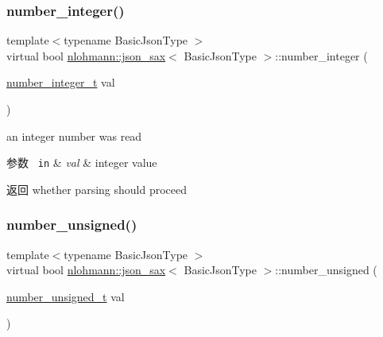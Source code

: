 \subsubsection{\texorpdfstring{number\_integer()}{number\_integer()}}
{\footnotesize\ttfamily template$<$typename Basic\+Json\+Type $>$ \\
virtual bool \mbox{\hyperlink{structnlohmann_1_1json__sax}{nlohmann\+::json\+\_\+sax}}$<$ Basic\+Json\+Type $>$\+::number\+\_\+integer (\begin{DoxyParamCaption}\item[{\mbox{\hyperlink{structnlohmann_1_1json__sax_a0cef30121f02b7fee85e9708148ea0aa}{number\+\_\+integer\+\_\+t}}}]{val }\end{DoxyParamCaption})\hspace{0.3cm}{\ttfamily [pure virtual]}}



an integer number was read 


\begin{DoxyParams}[1]{参数}
\mbox{\texttt{ in}}  & {\em val} & integer value \\
\hline
\end{DoxyParams}
\begin{DoxyReturn}{返回}
whether parsing should proceed 
\end{DoxyReturn}
\mbox{\label{structnlohmann_1_1json__sax_ad9b253083e0509923ba195136f49face}} 
\subsubsection{\texorpdfstring{number\_unsigned()}{number\_unsigned()}}
{\footnotesize\ttfamily template$<$typename Basic\+Json\+Type $>$ \\
virtual bool \mbox{\hyperlink{structnlohmann_1_1json__sax}{nlohmann\+::json\+\_\+sax}}$<$ Basic\+Json\+Type $>$\+::number\+\_\+unsigned (\begin{DoxyParamCaption}\item[{\mbox{\hyperlink{structnlohmann_1_1json__sax_a32028cc056ae0f43aaae331cdbbbf856}{number\+\_\+unsigned\+\_\+t}}}]{val }\end{DoxyParamCaption})\hspace{0.3cm}{\ttfamily [pure virtual]}}



